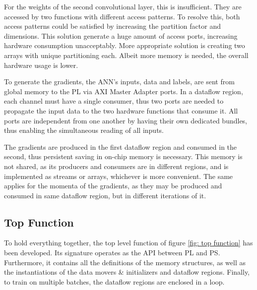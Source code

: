 For the weights of the second convolutional layer, this is insufficient. They are accessed by two functions with different access patterns. To resolve this, both access patterns could be satisfied by increasing the partition factor and dimensions. This solution generate a huge amount of access ports, increasing hardware consumption unacceptably. More appropriate solution is creating two arrays with unique partitioning each. Albeit more memory is needed, the overall hardware usage is lower. %

To generate the gradients, the ANN's inputs, data and labels, are sent from global memory to the PL via AXI Master Adapter ports. In a dataflow region, each channel must have a single consumer, thus two ports are needed to propagate the input data to the two hardware functions that consume it. All ports are independent from one another by having their own dedicated bundles, thus enabling the simultaneous reading of all inputs. %

The gradients are produced in the first dataflow region and consumed in the second, thus persistent saving in on-chip memory is necessary. This memory is not shared, as its producers and consumers are in different regions, and is implemented as streams or arrays, whichever is more convenient. The same applies for the momenta of the gradients, as they may be produced and consumed in same dataflow region, but in different iterations of it. %

\subsection{Top Function}
To hold everything together, the top level function of figure \ref{fig: top function} has been developed. Its signature operates as the API between PL and PS. Furthermore, it contains all the definitions of the memory structures, as well as the instantiations of the data movers \& initializers and dataflow regions. Finally, to train on multiple batches, the dataflow regions are enclosed in a loop.

